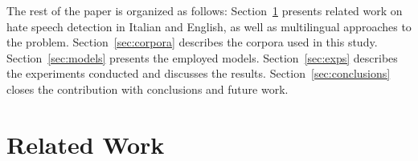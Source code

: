 \documentclass[11pt]{article}
\newcommand{\todoP}[1]{\todo[color=red]{P: #1}}
\newcommand{\mbert}{\mbox{mBERT$_{base}$}}
\newcommand{\umbert}{\mbox{UmBERTo}}
\newcommand{\albert}{\mbox{AlBERTo}}
\newcommand{\enforum}{\textit{Incels.is}}
\newcommand{\itforum}{\textit{Il forum dei brutti}}
\begin{document}
The rest of the paper is organized as follows: Section~\ref{sec:related-work} presents related work on hate speech detection in Italian and English, as well as multilingual approaches to the problem. Section~\ref{sec:corpora} describes the corpora used in this study. Section~\ref{sec:models} presents the employed models. Section~\ref{sec:exps} describes the experiments conducted and discusses the results. Section~\ref{sec:conclusions} closes the contribution with conclusions and future work.






\section{Related Work}
\label{sec:related-work}
\end{document}
